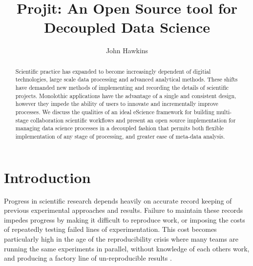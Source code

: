 \documentclass[sigconf]{acmart}
\begin{document}
\title{Projit: An Open Source tool for Decoupled Data Science}

\author{John Hawkins}

\renewcommand{\shortauthors}{Hawkins}

\begin{abstract} 
Scientific practice has expanded to become increasingly dependent of digitial technologies,
large scale data processing and advanced analytical methods. These shifts have demanded new
methods of implementing and recording the details of scientific projects. Monolothic applications
have the advantage of a single and consistent design, however they impede the ability of users to
innovate and incrementally improve processes. We discuss the qualities of an ideal eScience framework
for building multi-stage collaboration scientific workflows and present an open source implementation
for managing data science processes in a decoupled fashion that permits both flexible implementation of
any stage of processing, and greater ease of meta-data analysis.
\end{abstract}



\maketitle

\section{Introduction}

Progress in scientific research depends heavily on accurate record keeping of previous
experimental approaches and results. Failure to maintain these records impedes progress
by making it difficult to reproduce work, or imposing the costs of repeatedly testing 
failed lines of experimentation. This cost becomes particularly high in the age of the
reproducibility crisis where many teams are running the same experiments in parallel, without
knowledge of each others work, and producing a factory line of un-reproducible results 
\cite{Ioannidis2005}.
 
\end{document}
